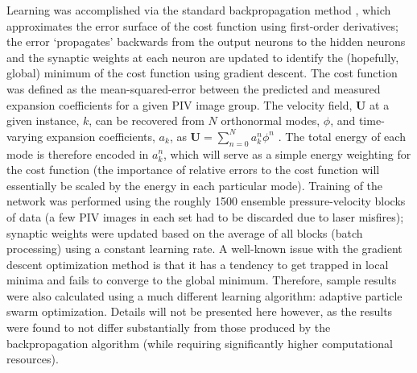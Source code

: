 Learning was accomplished via the standard backpropagation method \citep{Haykin1994}, which approximates the error surface of the cost function using first-order derivatives; the error `propagates' backwards from the output neurons to the hidden neurons and the synaptic weights at each neuron are updated to identify the (hopefully, global) minimum of the cost function using gradient descent.
The cost function was defined as the mean-squared-error between the predicted and measured expansion coefficients for a given PIV image group.
The velocity field, $\mathbf{U}$ at a given instance, $k$, can be recovered from $N$ orthonormal modes, $\phi$, and time-varying expansion coefficients, $a_k$, as $\mathbf{U} = \sum_{n=0}^{N} a_{k}^{n} \phi^n$ \citep{Berkooz1993}.
The total energy of each mode is therefore encoded in $a_k^n$, which will serve as a simple energy weighting for the cost function (the importance of relative errors to the cost function will essentially be scaled by the energy in each particular mode).
Training of the network was performed using the roughly 1500 ensemble pressure-velocity blocks of data (a few PIV images in each set had to be discarded due to laser misfires); synaptic weights were updated based on the average of all blocks (batch processing) using a constant learning rate.
A well-known issue with the gradient descent optimization method is that it has a tendency to get trapped in local minima and fails to converge to the global minimum.
Therefore, sample results were also calculated using a much different learning algorithm: adaptive particle swarm optimization.
Details will not be presented here however, as the results were found to not differ substantially from those produced by the backpropagation algorithm (while requiring significantly higher computational resources).

